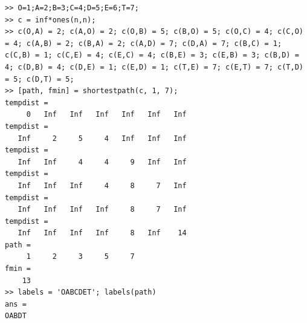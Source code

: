 \begin{daemi}\hspace{.1cm}
\begin{lstlisting}
>> O=1;A=2;B=3;C=4;D=5;E=6;T=7;
>> c = inf*ones(n,n);
>> c(O,A) = 2; c(A,O) = 2; c(O,B) = 5; c(B,O) = 5; c(O,C) = 4; c(C,O) = 4; c(A,B) = 2; c(B,A) = 2; c(A,D) = 7; c(D,A) = 7; c(B,C) = 1; c(C,B) = 1; c(C,E) = 4; c(E,C) = 4; c(B,E) = 3; c(E,B) = 3; c(B,D) = 4; c(D,B) = 4; c(D,E) = 1; c(E,D) = 1; c(T,E) = 7; c(E,T) = 7; c(T,D) = 5; c(D,T) = 5; 
>> [path, fmin] = shortestpath(c, 1, 7);
tempdist =
     0   Inf   Inf   Inf   Inf   Inf   Inf
tempdist =
   Inf     2     5     4   Inf   Inf   Inf
tempdist =
   Inf   Inf     4     4     9   Inf   Inf
tempdist =
   Inf   Inf   Inf     4     8     7   Inf
tempdist =
   Inf   Inf   Inf   Inf     8     7   Inf
tempdist =
   Inf   Inf   Inf   Inf     8   Inf    14
path =
     1     2     3     5     7
fmin =
    13
>> labels = 'OABCDET'; labels(path)
ans =
OABDT
\end{lstlisting}
\end{daemi}

